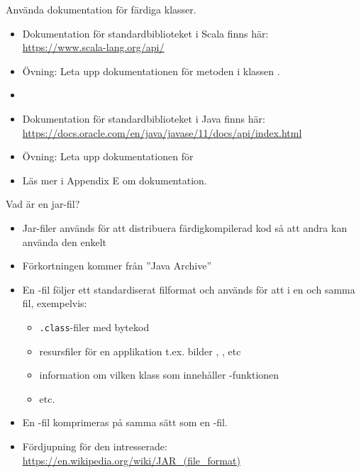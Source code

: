 


\begin{Slide}{Använda dokumentation för färdiga klasser.}
\begin{itemize}
  \item Dokumentation för standardbiblioteket i Scala finns här:  \\ \url{https://www.scala-lang.org/api/}
  \item Övning: Leta upp dokumentationen för metoden  i klassen .
  \item[]
  \item Dokumentation för standardbiblioteket i Java finns här:  \\ 
  \url{https://docs.oracle.com/en/java/javase/11/docs/api/index.html}
  \item Övning: Leta upp dokumentationen för 
  \item Läs mer i Appendix E om dokumentation.

\end{itemize}
\end{Slide}
  

\begin{Slide}{Vad är en jar-fil?}
\begin{itemize}
  \item Jar-filer används för att distribuera färdigkompilerad kod så att andra kan använda den enkelt
  \item Förkortningen  kommer från ''Java Archive''
  \item En -fil följer ett standardiserat filformat och används för att  i en och samma fil, exempelvis:
  \begin{itemize}
    \item \texttt{.class}-filer med bytekod
    \item resursfiler för en applikation t.ex. bilder , , etc
    \item information om vilken klass som innehåller -funktionen
    \item etc.
  \end{itemize}
  \item En -fil komprimeras på samma sätt som en -fil.
  \item Fördjupning för den intresserade:\\
  {\SlideFontTiny\url{https://en.wikipedia.org/wiki/JAR_(file_format)}}
\end{itemize}
\end{Slide}

